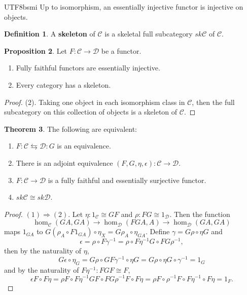 \documentclass[12pt]{article}
\theoremstyle{definition}
\newtheorem{definition}{Definition}[section]
\newtheorem{theorem}[definition]{Theorem}
\newtheorem{property}[definition]{Proposition}
\newcommand\<{\langle}
\renewcommand\>{\rangle}
\begin{document}
\begin{CJK}{UTF8}{bsmi}
Up to isomorphism, an essentially injective functor is injective on objects.

\begin{definition}
    A \textbf{skeleton} of $\mathcal{C}$ is a skeletal full subcategory $sk\mathcal{C}$ of $\mathcal{C}$.
\end{definition}


\begin{property}
    Let $F:\mathcal{C}\to\mathcal{D}$ be a functor.
    \begin{enumerate}
        \item Fully faithful functors are essentially injective.
        \item Every category has a skeleton.
    \end{enumerate}
\end{property}
\begin{proof}
    (2).
    Taking one object in each isomorphism class in $\mathcal{C}$, then the full subcategory on this collection of objects is a skeleton of $\mathcal{C}$.
\end{proof}

\begin{theorem}
    The following are equivalent:
    \begin{enumerate}
        \item $F:\mathcal{C}\leftrightarrows\mathcal{D}:G$ is an equivalence.
        \item There is an adjoint equivalence $(F, G, \eta, \epsilon):\mathcal{C}\to\mathcal{D}$.
        \item $F:\mathcal{C}\to\mathcal{D}$ is a fully faithful and essentially surjective functor.
        \item $sk\mathcal{C}\cong sk\mathcal{D}$.
    \end{enumerate}
\end{theorem}
\begin{proof}
    $(1)\Rightarrow(2)$.
    Let $\eta:1_\mathcal{C}\cong GF$ and $\rho:FG\cong1_\mathcal{D}$.
    Then the function
    \[
        \hom_\mathcal{C}(GA, GA) 
        \to
        \hom_\mathcal{D}(FGA, A)
        \to
        \hom_\mathcal{D}(GA, GA)
    \]
    maps $1_{GA}$ to $G(\rho_A\circ F1_{GA})\circ\eta_X=G\rho_A\circ\eta_{GA}$.
    Define $\gamma=G\rho\circ\eta G$ and
    \[
        \epsilon = \rho\circ F\gamma^{-1} = \rho\circ F\eta^{-1}G\circ FG\rho^{-1},
    \]
    then by the naturality of $\eta$,
    \[
        G\epsilon \circ \eta_G
        = G\rho \circ GF\gamma^{-1} \circ \eta G
        = G\rho \circ \eta G \circ \gamma^{-1}
        = 1_G
    \]
    and by the naturality of $F\eta^{-1}:FGF\cong F$,
    \[
        \epsilon F \circ F\eta 
        = \rho F \circ F\eta^{-1}GF \circ FG\rho^{-1}F \circ F\eta 
        = \rho F\circ \rho^{-1}F \circ F\eta^{-1} \circ F\eta
        = 1_F.
    \]
    

\end{proof}
\end{CJK}
\end{document}
